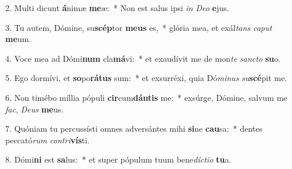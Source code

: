 2. Multi dicunt \textbf{á}nimæ \textbf{me}æ:~*  Non est salus ipsi \textit{in} \textit{De}\textit{o} \textbf{e}jus.\

3. Tu autem, Dómine, su\textbf{scép}tor \textbf{me}\textbf{us} es,~*  glória mea, et exál\textit{tans} \textit{ca}\textit{put} \textbf{me}um.\

4. Voce mea ad Dómi\textbf{num} cla\textbf{má}vi:~*  et exaudívit me de mon\textit{te} \textit{sanc}\textit{to} \textbf{su}o.\

5. Ego dormívi, et \textbf{so}po\textbf{rá}\textbf{tus} sum:~*  et exsurréxi, quia Dó\textit{mi}\textit{nus} \textit{su}\textbf{scé}pit me.\

6. Non timébo míllia pópuli \textbf{cir}cum\textbf{dán}\textbf{tis} me:~*  exsúrge, Dómine, salvum me \textit{fac}, \textit{De}\textit{us} \textbf{me}us.\

7. Quóniam tu percussísti omnes adversántes mihi \textbf{si}ne \textbf{cau}sa:~*  dentes peccató\textit{rum} \textit{con}\textit{tri}\textbf{vís}ti.\

8. Dómi\textbf{ni} est \textbf{sa}lus:~*  et super pópulum tuum bene\textit{díc}\textit{ti}\textit{o} \textbf{tu}a.\

